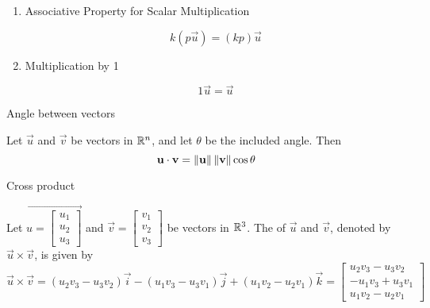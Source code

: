 \documentclass{ximera}
\begin{document}
\begin{enumerate}
  \item 
  Associative Property for Scalar Multiplication
  \begin{expandable}{}{}
  $$k(p\vec{u})=(kp)\vec{u}$$
  \end{expandable}

  \item 
  Multiplication by 1
  \begin{expandable}{}{}
  $$1\vec{u}=\vec{u}$$
  \end{expandable}
  \end{enumerate}


Angle between vectors

\begin{expandable}{}{}
     Let $\vec{u}$ and $\vec{v}$ be vectors in $\mathbb{R}^n$, and let $\theta$ be the included angle.  Then
  $$\mathbf{u}\cdot\mathbf{v}=\left\lVert\mathbf{u}\right\rVert\left\lVert\mathbf{v}\right\rVert\cos \theta$$
\end{expandable}

 
Cross product

\begin{expandable}{}{}
    Let $\vec{u=\begin{bmatrix}u_1\\u_2\\u_3\end{bmatrix}}$ and $\vec{v}=\begin{bmatrix}v_1\\v_2\\v_3\end{bmatrix}$ be vectors in $\mathbb{R}^3$.  The  of $\vec{u}$ and $\vec{v}$, denoted by $\vec{u}\times\vec{v}$, is given by
$$
\vec{u}\times\vec{v}=(u_2v_3-u_3v_2)\vec{i}-(u_1v_3-u_3v_1)\vec{j}+(u_1v_2-u_2v_1)\vec{k}=\begin{bmatrix}u_2v_3-u_3v_2\\-u_1v_3+u_3v_1\\u_1v_2-u_2v_1\end{bmatrix}
$$
\end{expandable}
\end{document}
